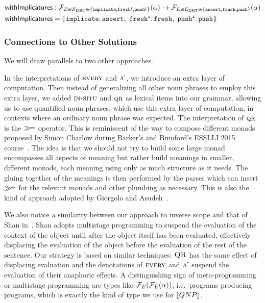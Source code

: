 \begin{align*}
  \withImplicatures &: \FF_{E \uplus E_\DRT \uplus \{\op{implicate},\op{fresh^i},\op{push^i}\}}(\alpha) \to
                       \FF_{E \uplus E_\DRT \uplus \{\op{assert},\op{fresh},\op{push}\}}(\alpha) \\
  \withImplicatures &= \banana{\onto{\op{implicate}}{\op{assert}},\
                               \onto{\op{fresh^i}}{\op{fresh}},\
                               \onto{\op{push^i}}{\op{push}}}
\end{align*}


\subsubsection{Connections to Other Solutions}

We will draw parallels to two other approaches.

In the interpretations of $\textsc{every}$ and $\textsc{a'}$, we introduce an
extra layer of computation. Then instead of generalizing all other noun
phrases to employ this extra layer, we added $\textsc{in-situ}$ and $\textsc{qr}$
as lexical items into our grammar, allowing us to use quantified noun
phrases, which use this extra layer of computation, in contexts where an
ordinary noun phrase was expected. The interpretation of $\textsc{qr}$ is the
$\mathbin{\gg\!=}$ operator. This is reminiscent of the way to compose different
monads proposed by Simon Charlow during Barker's and Bumford's ESSLLI 2015
course~\cite{barker2015monads}. The idea is that we should not try to build
some large monad encompasses all aspects of meaning but rather build
meanings in smaller, different monads, each meaning using only as much
structure as it needs. The gluing together of the meanings is then
performed by the parser which can insert $\mathbin{\gg\!=}$ for the relevant monads
and other plumbing as necessary. This is also the kind of approach adopted
by Giorgolo and Asudeh~\cite{giorgolo2015natural}.

We also notice a similarity between our approach to inverse scope and that
of Shan in~\cite{shan2007inverse}. Shan adopts multistage programming to
suspend the evaluation of the context of the object until after the object
itself has been evaluated, effectively displacing the evaluation of the
object before the evaluation of the rest of the sentence. Our strategy is
based on similar techniques: $\textsc{QR}$ has the same effect of displacing
evaluation and the denotations of $\textsc{every}$ and $\textsc{a'}$ suspend the
evaluation of their anaphoric effects. A distinguishing sign of
meta-programming or multistage programming are types like
$\mathcal{F}_E(\mathcal{F}_E(\alpha))$, i.e.\ programs producing programs, which is exactly
the kind of type we use for $\llbracket QNP \rrbracket$.


